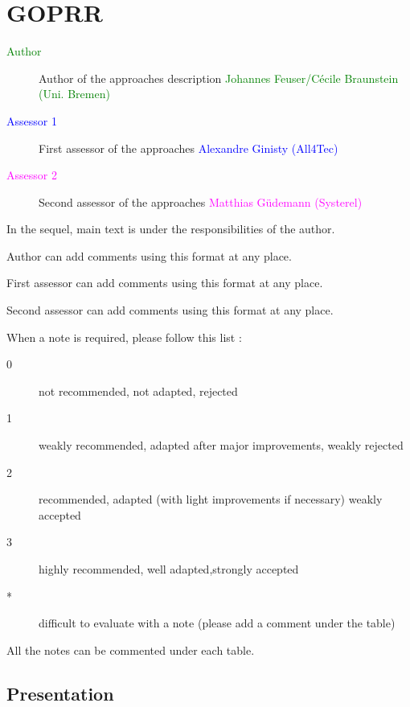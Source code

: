 \chapter{GOPRR}

\begin{description}
\item[\textcolor{green}{Author}] Author of the approaches description
  \textcolor{green}{Johannes Feuser/C\'ecile Braunstein  (Uni. Bremen)}
\item[\textcolor{blue}{Assessor 1}] First assessor of the approaches \textcolor{blue}{Alexandre Ginisty (All4Tec)}
\item[\textcolor{magenta}{Assessor 2}] Second assessor of the approaches \textcolor{magenta}{Matthias G\"udemann (Systerel)}
\end{description}

In the sequel, main text is under the responsibilities of the author.

\begin{author_comment}
Author can add comments using this format at any place.
\end{author_comment}

\begin{assessor1}
First assessor can add comments using this format at any place.
\end{assessor1}

\begin{assessor2}
Second assessor can add comments using this format at any place.
\end{assessor2}

When a note is required, please follow this list :
\begin{description}
\item[0] not recommended, not adapted, rejected
\item[1] weakly recommended, adapted after major improvements, weakly rejected
\item[2] recommended, adapted (with light improvements if necessary)  weakly accepted
\item[3] highly recommended, well adapted,strongly accepted
\item[*] difficult to evaluate with a note (please add a comment under the table)
\end{description}

All the notes can be commented under each table.

\section{Presentation}

